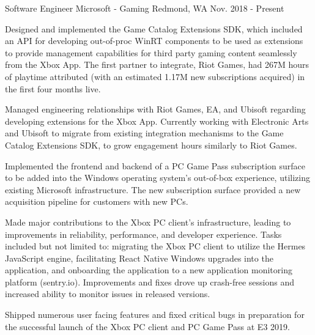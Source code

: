 
\begin{cventries}

  \cventry
    {Software Engineer} %
    {Microsoft - Gaming} %
    {Redmond, WA} %
    {Nov. 2018 - Present} %
    {
      \begin{cvitems} %
        \item{Designed and implemented the Game Catalog Extensions SDK, which included an API for developing out-of-proc WinRT components to be used as extensions to provide management capabilities for third party gaming content seamlessly from the Xbox App. The first partner to integrate, Riot Games, had 267M hours of playtime attributed (with an estimated 1.17M new subscriptions acquired) in the first four months live.} 
        \item{Managed engineering relationships with Riot Games, EA, and Ubisoft regarding developing extensions for the Xbox App. Currently working with Electronic Arts and Ubisoft to migrate from existing integration mechanisms to the Game Catalog Extensions SDK, to grow engagement hours similarly to Riot Games. } 
        \item{Implemented the frontend and backend of a PC Game Pass subscription surface to be added into the Windows operating system's out-of-box experience, utilizing existing Microsoft infrastructure. The new subscription surface provided a new acquisition pipeline for customers with new PCs.} 
        \item{Made major contributions to the Xbox PC client's infrastructure, leading to improvements in reliability, performance, and developer experience. Tasks included but not limited to: migrating the Xbox PC client to utilize the Hermes JavaScript engine, facilitating React Native Windows upgrades into the application, and onboarding the application to a new application monitoring platform (sentry.io). Improvements and fixes drove up crash-free sessions and increased ability to monitor issues in released versions.}
	      \item{Shipped numerous user facing features and fixed critical bugs in preparation for the successful launch of the Xbox PC client and PC Game Pass at E3 2019.}	
      \end{cvitems}
    }


\end{cventries}
